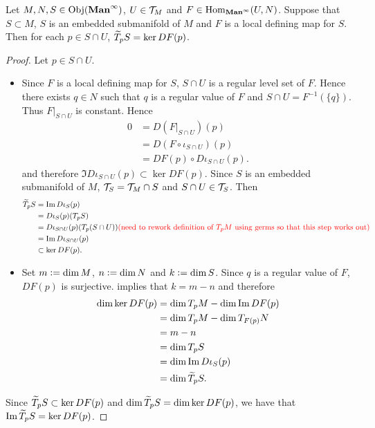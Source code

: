 \documentclass{book}
\begin{document}
	
	\begin{ex} 
		Let $M, N, S \in \operatorname{Obj}(\operatorname*{\text{\textbf{Man}}^{\infty}})$, $U \in \mathcal{T}_M$ and $F \in \operatorname{Hom}_{\operatorname*{\text{\textbf{Man}}^{\infty}}}(U, N)$. Suppose that $S \subset M$, $S$ is an embedded submanifold of $M$ and $F$ is a local defining map for $S$. Then for each $p \in S \cap U$, $\widetilde{T}_p S = \ker D F(p)$.
	\end{ex}
	
	\begin{proof}
		Let $p \in S \cap U$.
		\begin{itemize}
			\item Since $F$ is a local defining map for $S$, $S \cap U$ is a regular level set of $F$. Hence there exists $q \in N$ such that $q$ is a regular value of $F$ and $S \cap U = F^{-1}(\{q\})$. Thus $F|_{S \cap U}$ is constant. Hence
			\begin{align*}
				0
				& = D(F|_{S \cap U})(p) \\
				& = D(F \circ \iota_{S \cap U})(p) \\
				& = DF(p) \circ D \iota_{S \cap U}(p).
			\end{align*} 
			and therefore $\Im D \iota_{S \cap U}(p) \subset \ker DF(p)$. Since $S$ is an embedded submanifold of $M$, $\mathcal{T}_S = \mathcal{T}_M \cap S$ and $S \cap U \in \mathcal{T}_S$. Then
			\begin{align*}
				\widetilde{T}_pS 
				& = \text{Im} \, D\iota_S(p) \\
				& = D\iota_S(p)(T_p S) \\
				& = D\iota_{S \cap U}(p)(T_p (S \cap U)) \textcolor{red}{\text{(need to rework definition of $T_pM$ using germs so that this step works out)}} \\
				& = \text{Im} \, D\iota_{S \cap U} (p) \\
				& \subset \ker DF(p).
			\end{align*}
			\item Set $m \vcentcolon= \dim M$, $n \vcentcolon= \dim N$ and $k \vcentcolon= \dim S$. Since $q$ is a regular value of $F$, $DF(p)$ is surjective.  implies that $k = m-n$ and therefore
			\begin{align*}
				\dim \ker DF(p)
				& = \dim T_pM - \dim \text{Im} \, DF(p) \\
				& = \dim T_pM - \dim T_{F(p)}N \\
				& = m - n \\
				& = \dim T_p S \\
				& = \dim \text{Im} \, D \iota_S(p) \\
				& = \dim \widetilde{T}_p S.
			\end{align*}
		\end{itemize}
		Since $\widetilde{T}_p S \subset \ker DF(p)$ and $\dim \widetilde{T}_p S = \dim \ker DF(p)$, we have that $\text{Im} \, \widetilde{T}_p S = \ker D F(p)$. 
	\end{proof}
\end{document}

